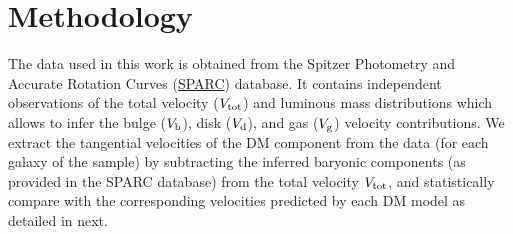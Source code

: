 \section{Methodology}
\label{sec:fitting}

The data used in this work is obtained from the Spitzer Photometry and Accurate Rotation Curves (\href{http://astroweb.cwru.edu/SPARC/}{SPARC}) database. It contains independent observations of the total velocity ($V_{\rm tot}$) and luminous mass distributions which allows to infer the bulge ($V_{\rm b}$), disk ($V_{\rm d}$), and gas ($V_{\rm g}$) velocity contributions. We extract the tangential velocities of the DM component from the data (for each galaxy of the sample) by subtracting the inferred baryonic components (as provided in the SPARC database) from the total velocity $V_{\rm tot}$, and statistically compare with the corresponding velocities predicted by each DM model as detailed in next. %




